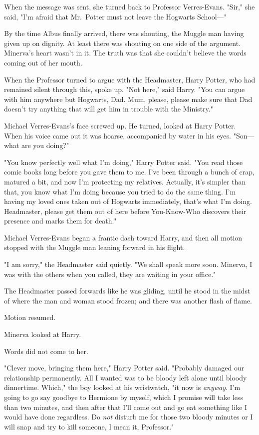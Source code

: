 When the message was sent, she turned back to Professor Verres-Evans. "Sir,"
she said, "I'm afraid that Mr.~Potter must not leave the Hogwarts School—"

By the time Albus finally arrived, there was shouting, the Muggle man having
given up on dignity. At least there was shouting on one side of the argument.
Minerva's heart wasn't in it. The truth was that she couldn't believe the words
coming out of her mouth.

When the Professor turned to argue with the Headmaster, Harry Potter, who had
remained silent through this, spoke up. "Not here," said Harry. "You can argue
with him anywhere but Hogwarts, Dad. Mum, please, please make sure that Dad
doesn't try anything that will get him in trouble with the Ministry."

Michael Verres-Evans's face screwed up. He turned, looked at Harry Potter. When
his voice came out it was hoarse, accompanied by water in his eyes. "Son—what
are you doing?"

"You know perfectly well what I'm doing," Harry Potter said. "You read those
comic books long before you gave them to me. I've been through a bunch of crap,
matured a bit, and now I'm protecting my relatives. Actually, it's simpler than
that, you know what I'm doing because you tried to do the same thing. I'm
having my loved ones taken out of Hogwarts immediately, that's what I'm doing.
Headmaster, please get them out of here before You-Know-Who discovers their
presence and marks them for death."

Michael Verres-Evans began a frantic dash toward Harry, and then all motion
stopped with the Muggle man leaning forward in his flight.

"I am sorry," the Headmaster said quietly. "We shall speak more soon. Minerva,
I was with the others when you called, they are waiting in your office."

The Headmaster passed forwards like he was gliding, until he stood in the midst
of where the man and woman stood frozen; and there was another flash of flame.

Motion resumed.

Minerva looked at Harry.

Words did not come to her.

"Clever move, bringing them here," Harry Potter said. "Probably damaged our
relationship permanently. All I wanted was to be bloody left alone until bloody
dinnertime. Which," the boy looked at his wristwatch, "it now is \emph{anyway}.
I'm going to go say goodbye to Hermione by myself, which I promise will take
less than two minutes, and then after that I'll come out and go eat something
like I would have done regardless. Do \emph{not} disturb me for those two
bloody minutes or I will snap and try to kill someone, I mean it, Professor."

